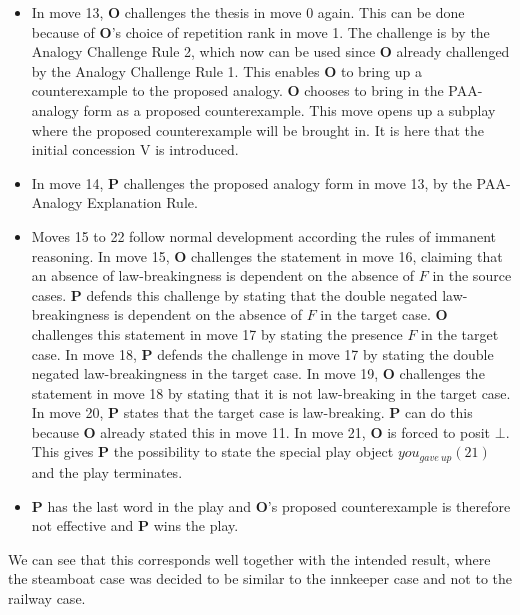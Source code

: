 \begin{itemize}
				\item In move 13, \textbf{O} challenges the thesis in move 0 again. This can be done because of \textbf{O}'s choice of repetition rank in move 1. The challenge is by the Analogy Challenge Rule 2, which now can be used since \textbf{O} already challenged by the Analogy Challenge Rule 1. This enables \textbf{O} to bring up a counterexample to the proposed analogy. \textbf{O} chooses to bring in the PAA-analogy form as a proposed counterexample. This move opens up a subplay where the proposed counterexample will be brought in. It is here that the initial concession V is introduced. 
				\item In move 14, \textbf{P} challenges the proposed analogy form in move 13, by the PAA-Analogy Explanation Rule. 
				\item Moves 15 to 22 follow normal development according the rules of immanent reasoning. In move 15, \textbf{O} challenges the statement in move 16, claiming that an absence of law-breakingness is dependent on the absence of $F$ in the source cases. \textbf{P} defends this challenge by stating that the double negated law-breakingness is dependent on the absence of $F$ in the target case. \textbf{O} challenges this statement in move 17 by stating the presence $F$ in the target case. In move 18, \textbf{P} defends the challenge in move 17 by stating the double negated law-breakingness in the target case. In move 19, \textbf{O} challenges the statement in move 18 by stating that it is not law-breaking in the target case. In move 20, \textbf{P} states that the target case is law-breaking. \textbf{P} can do this because \textbf{O} already stated this in move 11. In move 21, \textbf{O} is forced to posit $\bot$. This gives \textbf{P} the possibility to state the special play object $you_{gave \ up} (21)$ and the play terminates.
				\item \textbf{P} has the last word in the play and \textbf{O}'s proposed counterexample is therefore not effective and \textbf{P} wins the play.
				\end{itemize}
				
				We can see that this corresponds well together with the intended result, where the steamboat case was decided to be similar to the innkeeper case and not to the railway case. 
			
